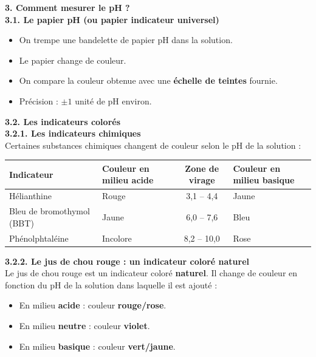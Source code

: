 \documentclass[11pt,a4paper]{article}
\begin{document}
\vspace{3mm}

\textbf{3. Comment mesurer le pH ?} \\

\textbf{3.1. Le papier pH (ou papier indicateur universel)}

\begin{itemize}
    \item On trempe une bandelette de papier pH dans la solution.
    \item Le papier change de couleur.
    \item On compare la couleur obtenue avec une \textbf{échelle de teintes} fournie.
    \item Précision : $\pm 1$ unité de pH environ.
\end{itemize}

\textbf{3.2. Les indicateurs colorés} \\

\textbf{3.2.1. Les indicateurs chimiques} \\

Certaines substances chimiques changent de couleur selon le pH de la solution :

\vspace{5mm}

\begin{center}
\begin{tabular}{|l|l|c|l|}
\hline
\textbf{Indicateur} & \textbf{Couleur en milieu acide} & \textbf{Zone de virage} & \textbf{Couleur en milieu basique} \\
\hline
Hélianthine & Rouge & 3,1 -- 4,4 & Jaune \\
\hline
Bleu de bromothymol (BBT) & Jaune & 6,0 -- 7,6 & Bleu \\
\hline
Phénolphtaléine & Incolore & 8,2 -- 10,0 & Rose \\
\hline
\end{tabular}
\end{center}

\vspace{3mm}

\textbf{3.2.2. Le jus de chou rouge : un indicateur coloré naturel} \\

Le jus de chou rouge est un indicateur coloré \textbf{naturel}. Il change de couleur en fonction du pH de la solution dans laquelle il est ajouté :

\begin{itemize}
    \item En milieu \textbf{acide} : couleur \textbf{rouge/rose}.
    \item En milieu \textbf{neutre} : couleur \textbf{violet}.
    \item En milieu \textbf{basique} : couleur \textbf{vert/jaune}.
\end{itemize}
\end{document}
